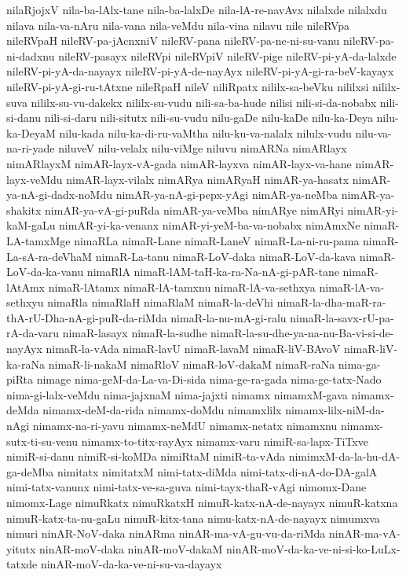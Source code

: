 {nilaRjojxV
nila-ba-lAlx-tane
nila-ba-lalxDe
nila-lA-re-navAvx
nilalxde
nilalxdu
nilava
nila-va-nAru
nila-vana
nila-veMdu
nila-vina
nilavu
nile
nileRVpa
nileRVpaH
nileRV-pa-jAcnxniV
nileRV-pana
nileRV-pa-ne-ni-su-vanu
nileRV-pa-ni-dadxnu
nileRV-pasayx
nileRVpi
nileRVpiV
nileRV-pige
nileRV-pi-yA-da-lalxde
nileRV-pi-yA-da-nayayx
nileRV-pi-yA-de-nayAyx
nileRV-pi-yA-gi-ra-beV-kayayx
nileRV-pi-yA-gi-ru-tAtxne
nileRpaH
nileV
niliRpatx
nililx-sa-beVku
nililxsi
nililx-suva
nililx-su-vu-dakekx
nililx-su-vudu
nili-sa-ba-hude
nilisi
nili-si-da-nobabx
nili-si-danu
nili-si-daru
nili-situtx
nili-su-vudu
nilu-gaDe
nilu-kaDe
nilu-ka-Deya
nilu-ka-DeyaM
nilu-kada
nilu-ka-di-ru-vaMtha
nilu-ku-va-nalalx
nilulx-vudu
nilu-va-na-ri-yade
niluveV
nilu-velalx
nilu-viMge
niluvu
nimARNa
nimARlayx
nimARlayxM
nimAR-layx-vA-gada
nimAR-layxva
nimAR-layx-va-hane
nimAR-layx-veMdu
nimAR-layx-vilalx
nimARya
nimARyaH
nimAR-ya-hasatx
nimAR-ya-nA-gi-dadx-noMdu
nimAR-ya-nA-gi-pepx-yAgi
nimAR-ya-neMba
nimAR-ya-shakitx
nimAR-ya-vA-gi-puRda
nimAR-ya-veMba
nimARye
nimARyi
nimAR-yi-kaM-gaLu
nimAR-yi-ka-venanx
nimAR-yi-yeM-ba-va-nobabx
nimAmxNe
nimaR-LA-tamxMge
nimaRLa
nimaR-Lane
nimaR-LaneV
nimaR-La-ni-ru-pama
nimaR-La-sA-ra-deVhaM
nimaR-La-tanu
nimaR-LoV-daka
nimaR-LoV-da-kava
nimaR-LoV-da-ka-vanu
nimaRlA
nimaR-lAM-taH-ka-ra-Na-nA-gi-pAR-tane
nimaR-lAtAmx
nimaR-lAtamx
nimaR-lA-tamxnu
nimaR-lA-va-sethxya
nimaR-lA-va-sethxyu
nimaRla
nimaRlaH
nimaRlaM
nimaR-la-deVhi
nimaR-la-dha-maR-ra-thA-rU-Dha-nA-gi-puR-da-riMda
nimaR-la-nu-mA-gi-ralu
nimaR-la-savx-rU-pa-rA-da-varu
nimaR-lasayx
nimaR-la-sudhe
nimaR-la-su-dhe-ya-na-nu-Ba-vi-si-de-nayAyx
nimaR-la-vAda
nimaR-lavU
nimaR-lavaM
nimaR-liV-BAvoV
nimaR-liV-ka-raNa
nimaR-li-nakaM
nimaRloV
nimaR-loV-dakaM
nimaR-raNa
nima-ga-piRta
nimage
nima-geM-da-La-va-Di-sida
nima-ge-ra-gada
nima-ge-tatx-Nado
nima-gi-lalx-veMdu
nima-jajxnaM
nima-jajxti
nimamx
nimamxM-gava
nimamx-deMda
nimamx-deM-da-rida
nimamx-doMdu
nimamxlilx
nimamx-lilx-niM-da-nAgi
nimamx-na-ri-yavu
nimamx-neMdU
nimamx-netatx
nimamxnu
nimamx-sutx-ti-su-venu
nimamx-to-titx-rayAyx
nimamx-varu
nimiR-sa-lapx-TiTxve
nimiR-si-danu
nimiR-si-koMDa
nimiRtaM
nimiR-ta-vAda
nimimxM-da-la-hu-dA-ga-deMba
nimitatx
nimitatxM
nimi-tatx-diMda
nimi-tatx-di-nA-do-DA-galA
nimi-tatx-vanunx
nimi-tatx-ve-sa-guva
nimi-tayx-thaR-vAgi
nimomx-Dane
nimomx-Lage
nimuRkatx
nimuRkatxH
nimuR-katx-nA-de-nayayx
nimuR-katxna
nimuR-katx-ta-nu-gaLu
nimuR-kitx-tana
nimu-katx-nA-de-nayayx
nimumxva
nimuri
ninAR-NoV-daka
ninARma
ninAR-ma-vA-gu-vu-da-riMda
ninAR-ma-vA-yitutx
ninAR-moV-daka
ninAR-moV-dakaM
ninAR-moV-da-ka-ve-ni-si-ko-LuLx-tatxde
ninAR-moV-da-ka-ve-ni-su-va-dayayx
}
